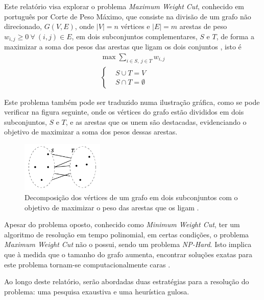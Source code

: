 \documentclass[mirror]{revdetua}
\begin{document}
Este relatório visa explorar o problema \textit{Maximum Weight Cut}, conhecido em português por Corte de Peso Máximo, que consiste na divisão de um grafo não direcionado, $G(V, E)$, onde $|V| = n$ vértices e $|E| = m$ arestas de peso $w_{i,j} \geq 0\ \forall\ (i,j) \in E$, em dois subconjuntos complementares, $S$ e $T$, de forma a maximizar a soma dos pesos das arestas que ligam os dois conjuntos \cite{SC03}, isto é
\begin{equation*}
    \begin{split}
        \max \sum_{i \in S,\ j \in T} w_{i,j} \\ 
        \left\{\begin{split}
            &S \cup T = V \\
            &S \cap T = \emptyset
        \end{split}\right.
    \end{split}
\end{equation*}

Este problema também pode ser traduzido numa ilustração gráfica, como se pode verificar na figura seguinte, onde os vértices do grafo estão divididos em dois subconjuntos, $S$ e $T$, e as arestas que os unem são destacadas, evidenciando o objetivo de maximizar a soma dos pesos dessas arestas.

\begin{figure}[h]
    \centering
    \includegraphics[width=0.35\textwidth]{../assets/problem.png}
    \caption{Decomposição dos vértices de um grafo em dois subconjuntos com o objetivo de maximizar o peso das arestas que os ligam \cite{SS23}.}
    \label{fig:problem}
\end{figure}

Apesar do problema oposto, conhecido como \textit{Minimum Weight Cut}, ter um algoritmo de resolução em tempo polinomial, em certas condições, o problema \textit{Maximum Weight Cut} não o possui, sendo um problema \textit{NP-Hard}. Isto implica que à medida que o tamanho do grafo aumenta, encontrar soluções exatas para este problema tornam-se computacionalmente caras \cite{SS23}.

Ao longo deste relatório, serão abordadas duas estratégias para a resolução do problema: uma pesquisa exaustiva e uma heurística gulosa.
\end{document}
